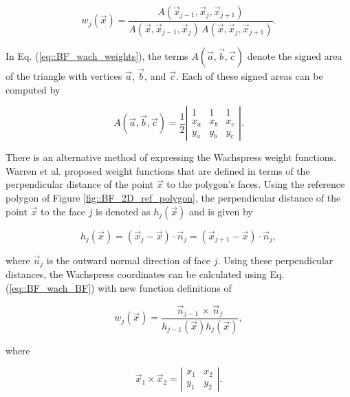 \begin{equation}
\label{eq::BF_wach_weights}
w_j (\vec{x})  = \frac{A(\vec{x}_{j-1}, \vec{x}_{j}, \vec{x}_{j+1})}{A(\vec{x}, \vec{x}_{j-1}, \vec{x}_{j}) \, A(\vec{x}, \vec{x}_{j}, \vec{x}_{j+1})} .
\end{equation}

\noindent In Eq. (\ref{eq::BF_wach_weights}), the terms $A(\vec{a}, \vec{b}, \vec{c})$ denote the signed area of the triangle with vertices $\vec{a}$, $\vec{b}$, and $\vec{c}$. Each of these signed areas can be computed by

\begin{equation}
\label{eq::BF_wach_signed_area}
A(\vec{a}, \vec{b}, \vec{c}) = \frac{1}{2}
\left|  
  \begin{array}{ccc}
  1 & 1 & 1 \\
  x_a & x_b & x_c \\
  y_a & y_b & y_c
  \end{array}
\right| .
\end{equation}

There is an alternative method of expressing the Wachspress weight functions. Warren et al. \cite{warren2007barycentric} proposed weight functions that are defined in terms of the perpendicular distance of the point $\vec{x}$ to the polygon's faces. Using the reference polygon of Figure \ref{fig::BF_2D_ref_polygon}, the perpendicular distance of the point $\vec{x}$ to the face $j$ is denoted as $h_j (\vec{x})$ and is given by

\begin{equation}
\label{eq::BF_wach_perp_dist}
h_j (\vec{x}) = \left(  \vec{x}_j - \vec{x} \right) \cdot \vec{n}_j = \left(  \vec{x}_{j+1} - \vec{x} \right) \cdot \vec{n}_j , 
\end{equation}

\noindent where $\vec{n}_j$ is the outward normal direction of face $j$. Using these perpendicular distances, the Wachspress coordinates can be calculated using Eq. (\ref{eq::BF_wach_BF}) with new function definitions of

\begin{equation}
\label{eq::BF_wach_wt_perpdist}
 w_j (\vec{x}) = \frac{\vec{n}_{j-1} \, \times \, \vec{n}_j}{h_{j-1} (\vec{x}) h_j (\vec{x})} ,
\end{equation}

\noindent where

\begin{equation}
\label{eq::BF_wach_cross}
\vec{x}_{1} \times \vec{x}_2 = 
\left|  
\begin{array}{ccc}
x_1 & x_2 \\
y_1 & y_2
\end{array}
\right| .
\end{equation}

